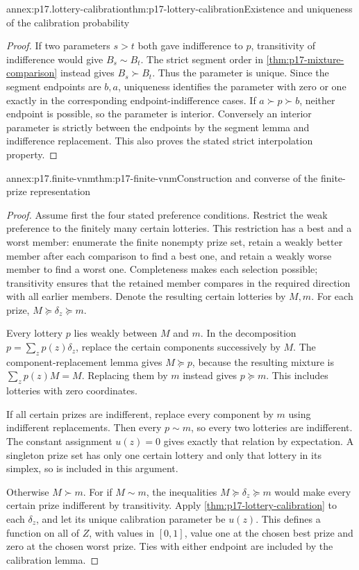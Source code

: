 \begin{annexitem}{annex:p17.lottery-calibration}{thm:p17-lottery-calibration}{Existence and uniqueness of the calibration probability}
\begin{proof}
If two parameters \(s>t\) both gave indifference to \(p\),
transitivity of indifference would give \(B_s\sim B_t\). The strict
segment order in \cref{thm:p17-mixture-comparison} instead gives
\(B_s\succ B_t\). Thus the parameter is unique. Since the segment
endpoints are \(b,a\), uniqueness identifies the parameter with zero
or one exactly in the corresponding endpoint-indifference cases. If
\(a\succ p\succ b\), neither endpoint is possible, so the parameter
is interior. Conversely an interior parameter is strictly between the
endpoints by the segment lemma and indifference replacement. This also
proves the stated strict interpolation property.
\end{proof}
\end{annexitem}

\begin{annexitem}{annex:p17.finite-vnm}{thm:p17-finite-vnm}{Construction and converse of the finite-prize representation}
\begin{proof}
Assume first the four stated preference conditions. Restrict the weak
preference to the finitely many certain lotteries. This restriction
has a best and a worst member: enumerate the finite nonempty prize set,
retain a weakly better member after each comparison to find a best one,
and retain a weakly worse member to find a worst one. Completeness
makes each selection possible; transitivity ensures that the retained
member compares in the required direction with all earlier members.
Denote the resulting certain lotteries by \(M,m\). For each prize,
\(M\succeq\delta_z\succeq m\).

Every lottery \(p\) lies weakly between \(M\) and \(m\).
In the decomposition \(p=\sum_zp(z)\delta_z\), replace the certain
components successively by \(M\). The component-replacement lemma
gives \(M\succeq p\), because the resulting mixture is
\(\sum_zp(z)M=M\). Replacing them by \(m\) instead gives
\(p\succeq m\). This includes lotteries with zero coordinates.

If all certain prizes are indifferent, replace every component by
\(m\) using indifferent replacements. Then every \(p\sim m\),
so every two lotteries are indifferent. The constant assignment
\(u(z)=0\) gives exactly that relation by expectation. A singleton
prize set has only one certain lottery and only that lottery in its
simplex, so is included in this argument.

Otherwise \(M\succ m\). For if \(M\sim m\), the inequalities
\(M\succeq\delta_z\succeq m\) would make every certain prize
indifferent by transitivity. Apply \cref{thm:p17-lottery-calibration}
to each \(\delta_z\), and let its unique calibration parameter be
\(u(z)\). This defines a function on all of \(Z\), with values in
\([0,1]\), value one at the chosen best prize and zero at the chosen
worst prize. Ties with either endpoint are included by the calibration
lemma.


\end{proof}
\end{annexitem}
